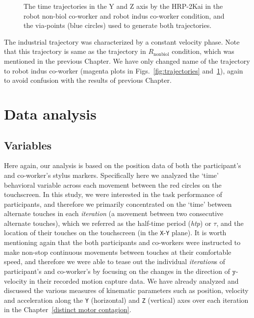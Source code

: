 \begin{figure}[hpt]
	\caption{The time trajectories in the Y and Z axis by the HRP-2Kai in the robot non-biol co-worker and robot indus co-worker condition, and the via-points (blue circles) used to generate both trajectories.}
	\label{fig:trajectories2}
\end{figure}


The industrial trajectory was characterized by a constant velocity phase. Note that this trajectory is same as the trajectory in $R_{\text{nonbiol}}$ condition, which was mentioned in the previous Chapter. We have only changed name of the trajectory to robot indus co-worker (magenta plots in Figs.~\ref{fig:trajectories} and~\ref{fig:trajectories2}), again to avoid confusion with the results of previous Chapter.
 
\clearpage

\section{Data analysis} \label{data_analysis}

\subsection{Variables}

Here again, our analysis is based on the position data of both the participant's and co-worker's stylus markers. Specifically here we analyzed the `time' behavioral variable across each movement between the red circles on the touchscreen. In this study, we were interested in the task performance of participants, and therefore we primarily concentrated on the `time' between alternate touches in each \textit{iteration} (a movement between two consecutive alternate touches), which we referred as the half-time period ({\it htp}) or $\tau$, and the location of their touches on the touchscreen (in the \texttt{X}-\texttt{Y} plane). It is worth mentioning again that the both participants and co-workers were instructed to make non-stop continuous movements between touches at their comfortable speed, and therefore we were able to tease out the individual \textit{iteration}s of participant's and co-worker's by focusing on the changes in the direction of $\texttt{y}$-velocity in their recorded motion capture data. We have already analyzed and discussed the various measures of kinematic parameters such as position, velocity and acceleration along the \texttt{Y} (horizontal) and \texttt{Z} (vertical) axes over each iteration in the Chapter~\ref{distinct motor contagion}.


